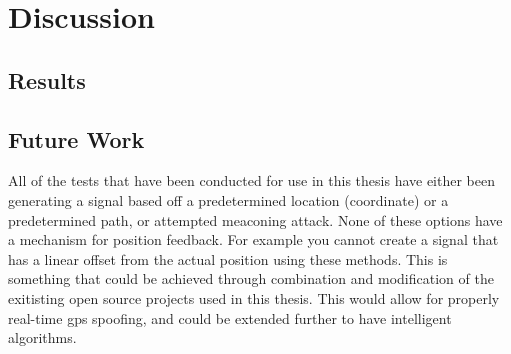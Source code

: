
\chapter{Discussion} %

\label{Chapter6} %


\section{Results}

\section{Future Work}
All of the tests that have been conducted for use in this thesis have either been generating a signal based off a predetermined location (coordinate) or a predetermined
path, or attempted meaconing attack. None of these options have a mechanism for position feedback. For example you cannot create a signal that has a linear offset from
the actual position using these methods. This is something that could be achieved through combination and modification of the exitisting open source projects used in this
thesis. This would allow for properly real-time gps spoofing, and could be extended further to have intelligent algorithms.